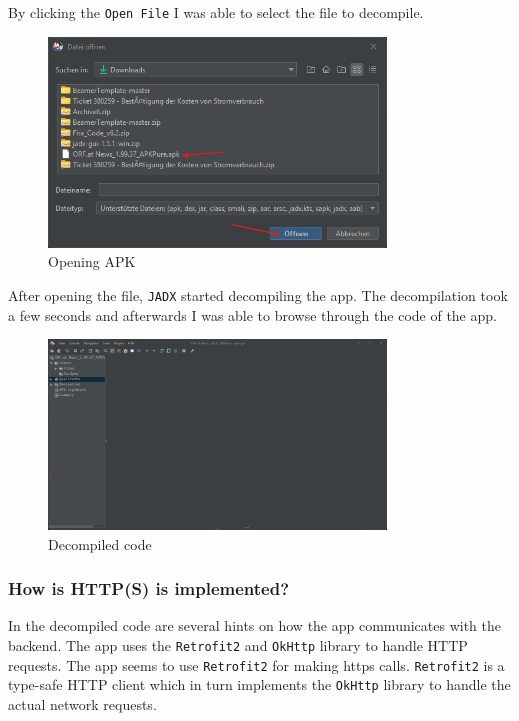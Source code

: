 \documentclass[12pt,a4paper]{article}
\begin{document}
By clicking the \texttt{Open File} I was able to select the file to decompile.

\begin{figure}[H]
\centering
\includegraphics[width=0.8\textwidth]{./screenshots/opening_apk.png}
\caption{Opening APK}
\end{figure}

After opening the file, \texttt{JADX} started decompiling the app. The decompilation took a few seconds and afterwards I was able to browse through the code of the app.

\begin{figure}[H]
\centering
\includegraphics[width=0.8\textwidth]{./screenshots/jadx_decompiled.png}
\caption{Decompiled code}
\end{figure}


\subsubsection{How is HTTP(S) is implemented?}

In the decompiled code are several hints on how the app communicates with the backend. The app uses the \texttt{Retrofit2} and \texttt{OkHttp} library to handle HTTP requests.
The app seems to use \texttt{Retrofit2} for making https calls. \texttt{Retrofit2} is a type-safe HTTP client which in turn implements the \texttt{OkHttp} library to handle the actual network requests.
\end{document}
